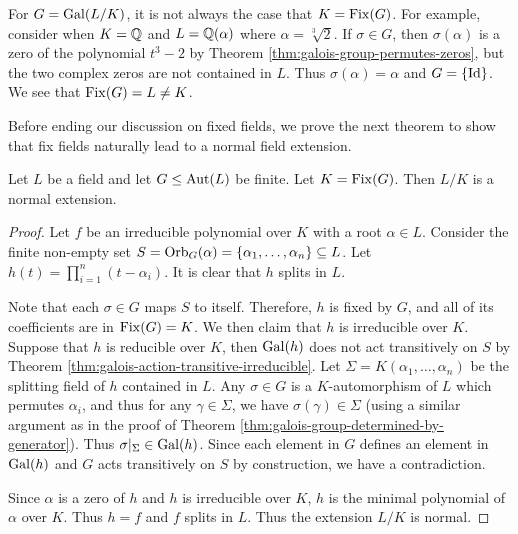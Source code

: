 \begin{example}
    For $G = \operatorname{Gal}(L/K)$, it is not always the case that $K = \operatorname{Fix}(G)$. For example, consider when $K = \mathbb Q$ and $L = \mathbb Q (\alpha)$ where $\alpha = \sqrt[3]{2}$. If $\sigma \in G$, then $\sigma(\alpha)$ is a zero of the polynomial $t^3 - 2$ by Theorem \ref{thm:galois-group-permutes-zeros}, but the two complex zeros are not contained in $L$. Thus $\sigma(\alpha) = \alpha$ and $G = \{ \operatorname{Id} \}$. We see that $\operatorname{Fix}(G) = L \neq K$. 
\end{example}



Before ending our discussion on fixed fields, we prove the next theorem to show that fix fields naturally lead to a normal field extension. 

\begin{theorem} \label{thm:fix-extension-normal}
	Let $L$ be a field and let $G \le \operatorname{Aut}(L)$ be finite. Let $K = \operatorname{Fix}(G)$. Then $L/K$ is a normal extension.
\end{theorem}

\begin{proof}
	
	Let $f$ be an irreducible polynomial over $K$ with a root $\alpha \in L$. Consider the finite non-empty set $S = \operatorname{Orb}_G(\alpha) = \{ \alpha_1, \ldots, \alpha_n\} \subseteq L$. Let $h(t) = \prod_{i = 1} ^n (t - \alpha_i)$. It is clear that $h$ splits in $L$.
	
	Note that each $\sigma \in G$ maps $S$ to itself. Therefore, $h$ is fixed by $G$, and all of its coefficients are in $\operatorname{Fix}(G) = K$. We then claim that $h$ is irreducible over $K$. Suppose that $h$ is reducible over $K$, then $\operatorname{Gal}(h)$ does not act transitively on $S$ by Theorem \ref{thm:galois-action-transitive-irreducible}. Let $\Sigma = K(\alpha_1, \dots, \alpha_n)$ be the splitting field of $h$ contained in $L$.  Any $\sigma \in G$ is a $K$-automorphism of $L$ which permutes $\alpha_i$, and thus for any $\gamma \in \Sigma$, we have $\sigma(\gamma) \in \Sigma$ (using a similar argument as in the proof of Theorem \ref{thm:galois-group-determined-by-generator}). Thus $\sigma | _ \Sigma \in \operatorname{Gal}(h)$. 
	Since each element in $G$ defines an element in $\operatorname{Gal}(h)$ and $G$ acts transitively on $S$ by construction, we have a contradiction. 
	
	Since $\alpha$ is a zero of $h$ and $h$ is irreducible over $K$, $h$ is the minimal polynomial of $\alpha$ over $K$. Thus $h = f$ and $f$ splits in $L$. Thus the extension $L/K$ is normal. 
\end{proof}
